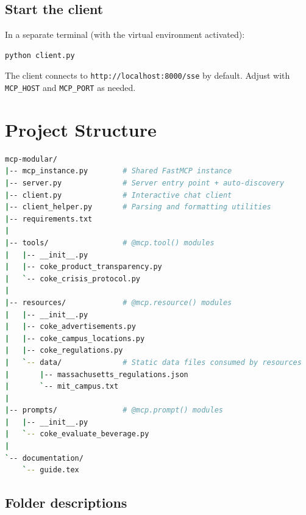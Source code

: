\documentclass[11pt, a4paper]{article}
\begin{document}
\subsection{Start the client}

In a separate terminal (with the virtual environment activated):

\begin{lstlisting}[language=bash, style=python, numbers=none]
python client.py
\end{lstlisting}

The client connects to \texttt{http://localhost:8000/sse} by default. Adjust with \texttt{MCP\_HOST} and \texttt{MCP\_PORT} as needed.

\section{Project Structure}

\begin{lstlisting}[language=bash, style=python, numbers=none]
mcp-modular/
|-- mcp_instance.py        # Shared FastMCP instance
|-- server.py              # Server entry point + auto-discovery
|-- client.py              # Interactive chat client
|-- client_helper.py       # Parsing and formatting utilities
|-- requirements.txt
|
|-- tools/                 # @mcp.tool() modules
|   |-- __init__.py
|   |-- coke_product_transparency.py
|   `-- coke_crisis_protocol.py
|
|-- resources/             # @mcp.resource() modules
|   |-- __init__.py
|   |-- coke_advertisements.py
|   |-- coke_campus_locations.py
|   |-- coke_regulations.py
|   `-- data/              # Static data files consumed by resources
|       |-- massachusetts_regulations.json
|       `-- mit_campus.txt
|
|-- prompts/               # @mcp.prompt() modules
|   |-- __init__.py
|   `-- coke_evaluate_beverage.py
|
`-- documentation/
    `-- guide.tex
\end{lstlisting}

\subsection{Folder descriptions}
\end{document}
